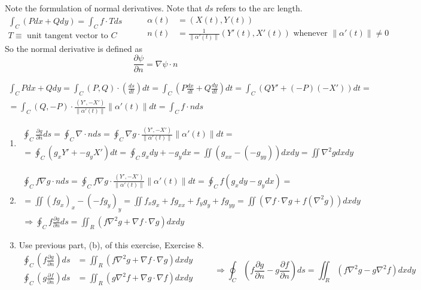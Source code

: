 \documentclass[twoside]{amsart}
\theoremstyle{plain}
\theoremstyle{definition}
\newcommand{\exercisehead}[1]
  {
   \noindent{\small\bf Exercise #1.}
   \smallskip}
\begin{document}
Note the formulation of normal derivatives.  Note that $ds$ refers to the arc length.  
\[
\begin{gathered}
  \int_C (P dx + Q dy ) = \int_C f\cdot T ds \\ 
  T \equiv \text{ unit tangent vector to $C$ } 
\end{gathered} \quad \quad \, \begin{aligned} \alpha(t) & = (X(t),Y(t) ) \\ n(t) & = \frac{1}{ \| \alpha'(t) \| } (Y'(t), X'(t)) \text{ whenever } \| \alpha'(t) \| \neq 0  \end{aligned}
\]
So the normal derivative is defined as 
\[
\frac{ \partial \psi }{ \partial n} = \nabla \psi \cdot n 
\]
\exercisehead{7} \[
\begin{gathered}
  \int_C P dx + Q dy = \int_C (P,Q) \cdot \left( \frac{ds}{dt} \right) dt = \int_C \left( P \frac{dx}{dt} + Q \frac{dy}{dt} \right) dt = \int_C (Q Y' + (-P)(-X'))dt = \\
  = \int_C (Q,-P)\cdot \frac{ (Y',-X')}{ \| \alpha'(t) \|} \| \alpha'(t) \| dt = \int_C f\cdot n ds
\end{gathered}
\]

\exercisehead{8} \begin{enumerate}
\item \[
  \begin{gathered}
    \oint_C \frac{\partial g}{\partial n} ds = \oint_C \nabla \cdot n ds = \oint_C \nabla g \cdot \frac{ (Y', -X')}{\| \alpha'(t) \| } \| \alpha'(t) \| dt = \\
    = \oint_C (g_x Y' + -g_y X')dt = \oint_C g_x dy + - g_y dx = \iint (g_{xx} - (-g_{yy})) dx dy = \iint \nabla^2 g dx dy 
\end{gathered}
  \]
\item \[
\begin{gathered}
  \oint_C f \nabla g \cdot n ds = \oint_C f \nabla g \cdot \frac{ (Y',-X') }{ \| \alpha'(t) \| } \| \alpha'(t) \| dt = \oint_C f(g_x dy - g_y dx) = \\
  = \iint (fg_x)_x - (-fg_y)_y = \iint f_x g_x + fg_{xx} + f_y g_y + f g_{yy} = \iint (\nabla f \cdot \nabla g + f(\nabla^2 g) ) dx dy \\
  \Longrightarrow \oint_C f \frac{\partial g}{\partial n} ds = \iint_R (f\nabla^2 g + \nabla f \cdot \nabla g ) dx dy 
\end{gathered}
\]
\item Use previous part, (b), of this exercise, Exercise 8.  
\[
\begin{aligned}
  \oint_C \left( f \frac{ \partial g }{\partial n} \right) ds & = \iint_R (f\nabla^2 g + \nabla f\cdot \nabla g ) dx dy \\ 
  \oint_C \left( g \frac{ \partial f }{\partial n} \right) ds & = \iint_R (g\nabla^2 f + \nabla g\cdot \nabla f ) dx dy \\ 
\end{aligned} \quad \quad \, \Longrightarrow \oint_C \left( f \frac{ \partial g}{\partial n} - g \frac{ \partial f}{ \partial n } \right) ds = \iint_R ( f \nabla^2 g - g \nabla^2 f) dx dy 
\]
\end{enumerate}
\end{document}
